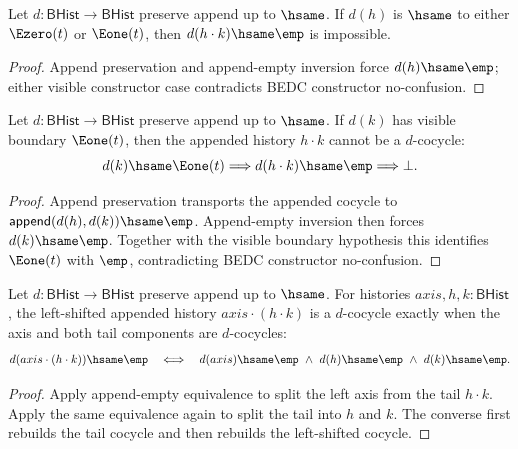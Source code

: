 \begin{theorem}
\label{thm:cohomology-cocycle-append-left-visible-boundary-empty-absurd}
Let $d:\mathsf{BHist}\to\mathsf{BHist}$ preserve append up to $\hsame$. If
$d(h)$ is $\hsame$ to either $\Ezero(t)$ or $\Eone(t)$, then
$d(h\cdot k)\hsame\emp$ is impossible.
\end{theorem}
\begin{proof}
Append preservation and append-empty inversion force $d(h)\hsame\emp$; either
visible constructor case contradicts BEDC constructor no-confusion.
\end{proof}

\begin{theorem}
\label{thm:cohomology-cocycle-append-right-e1-boundary-empty-absurd}
Let $d:\mathsf{BHist}\to\mathsf{BHist}$ preserve append up to $\hsame$. If
$d(k)$ has visible boundary $\Eone(t)$, then the appended history $h\cdot k$
cannot be a $d$-cocycle:
$$
d(k)\hsame\Eone(t)\Longrightarrow d(h\cdot k)\hsame\emp\Longrightarrow\bot.
$$
\end{theorem}
\begin{proof}
Append preservation transports the appended cocycle to
$\mathsf{append}(d(h),d(k))\hsame\emp$. Append-empty inversion then forces
$d(k)\hsame\emp$. Together with the visible boundary hypothesis this identifies
$\Eone(t)$ with $\emp$, contradicting BEDC constructor no-confusion.
\end{proof}

\begin{theorem}
\label{thm:cohomology-cocycle-left-shift-append-empty-iff}
Let $d:\mathsf{BHist}\to\mathsf{BHist}$ preserve append up to $\hsame$. For
histories $axis,h,k:\mathsf{BHist}$, the left-shifted appended history
$axis\cdot(h\cdot k)$ is a $d$-cocycle exactly when the axis and both tail
components are $d$-cocycles:
$$
d(axis\cdot(h\cdot k))\hsame\emp
\quad\Longleftrightarrow\quad
d(axis)\hsame\emp\ \wedge\ d(h)\hsame\emp\ \wedge\ d(k)\hsame\emp.
$$
\end{theorem}
\begin{proof}
Apply append-empty equivalence to split the left axis from the tail
$h\cdot k$. Apply the same equivalence again to split the tail into $h$ and
$k$. The converse first rebuilds the tail cocycle and then rebuilds the
left-shifted cocycle.
\end{proof}


